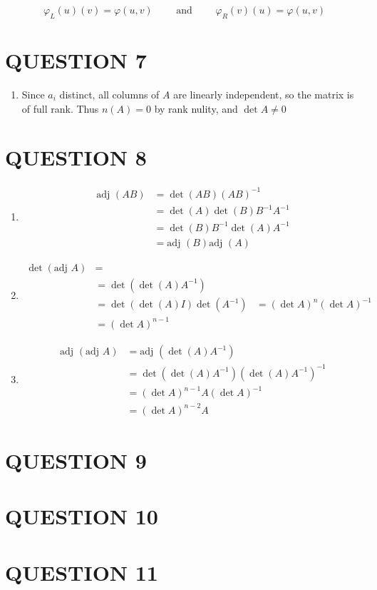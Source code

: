 \documentclass[a4paper]{article}
\begin{document}
\[ \varphi_{L}(u)(v) = \varphi(u,v) \qquad \text{ and } \qquad \varphi_{R}(v)(u) = \varphi(u,v) \]



\section{QUESTION 7}

\begin{enumerate}[label = (\alph*)]
	\item Since $ a_{i} $ distinct, all columns of $ A $ are linearly independent, so the matrix is of full rank. Thus $ n(A) = 0 $ by rank nulity, and $ \det A \neq 0 $
	
	
	
	
\end{enumerate}


\section{QUESTION 8}

\begin{enumerate}
	\item \begin{align*}
	\text{adj }(AB)  & =  \det(AB) (AB)^{-1}  \\
	& = \det(A)\det(B)B^{-1}A^{-1} \\
	& = \det(B) B^{-1} \det(A) A^{-1} \\
	& = \text{adj }(B) \text{adj }(A)
	\end{align*}
	
	\item \begin{align*}
	\det (\text{adj } A)& = \\
	& = \det ( \det (A) A^{-1} ) \\
	& = \det ( \det(A) I ) \det (A^{-1})
	& = (\det A)^{n} (\det A)^{-1} \\
	& = (\det A)^{n-1}
	\end{align*}	
	
	\item \begin{align*}
	\text{adj } (\text{adj } A)& = \text{adj } (  \det(A) A^{-1} ) \\
	& = \det ( \det (A) A^{-1} ) ( \det (A) A^{-1} )^{-1} \\
	& = (\det A)^{n-1} A (\det A)^{-1} \\
	& = (\det A)^{n-2} A 
	\end{align*}
\end{enumerate}



\section{QUESTION 9}
\section{QUESTION 10}
\section{QUESTION 11}

	
	
	
\end{document}
